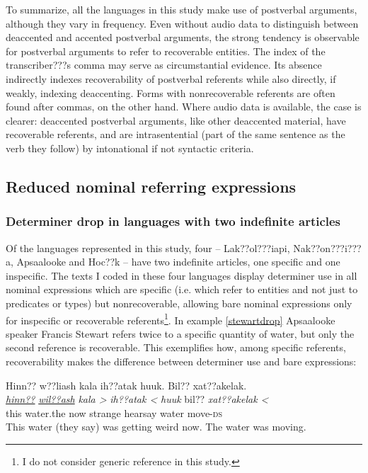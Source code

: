 \documentclass[output=paper]{LSP/langsci}
\begin{document}
To summarize, all the languages in this study make use of postverbal arguments, although they vary in frequency. Even without audio data to distinguish between deaccented and accented postverbal arguments, the strong tendency is observable for postverbal arguments to refer to recoverable entities. The index of the transcriber???s comma may serve as circumstantial evidence. Its absence indirectly indexes recoverability of postverbal referents while also directly, if weakly, indexing deaccenting. Forms with nonrecoverable referents are often found after commas, on the other hand. Where audio data is available, the case is clearer: deaccented postverbal arguments, like other deaccented material, have recoverable referents, and are intrasentential (part of the same sentence as the verb they follow) by intonational if not syntactic criteria.

\subsection{Reduced nominal referring expressions}\label{nominalreduction}

\subsubsection{Determiner drop in languages with two indefinite articles}\label{droptwoindef}

Of the languages represented in this study, four -- Lak??ol???iapi, Nak??on???i???a, Apsaalooke and Hoc??k -- have two indefinite articles, one specific and one inspecific. The texts I coded in these four languages display determiner use in all nominal expressions which are specific (i.e. which refer to entities and not just to predicates or types) but nonrecoverable, allowing bare nominal expressions only for inspecific or recoverable referents\footnote{I do not consider generic reference in this study.}. In example \ref{stewartdrop} Apsaalooke speaker Francis Stewart refers twice to a specific quantity of water, but only the second reference is recoverable. This exemplifies how, among specific referents, recoverability makes the difference between determiner use and bare expressions:

\ea\label{stewartdrop}
Hinn?? w??liash kala ih??atak huuk. Bil?? xat??akelak.\footnotemark\\
\gll	\emph{\underline{hinn??}} 	\emph{\underline{wil??ash}} 		\emph{kala >} 	\emph{ih??atak <}		\emph{huuk} 	bil?? 		\emph{xat??akelak <}\\
	this 				water.the 					now 			strange 			hearsay 		water		move-\textsc{ds}\\
\glt	This water (they say) was getting weird now. The water was moving.
\z
\end{document}
